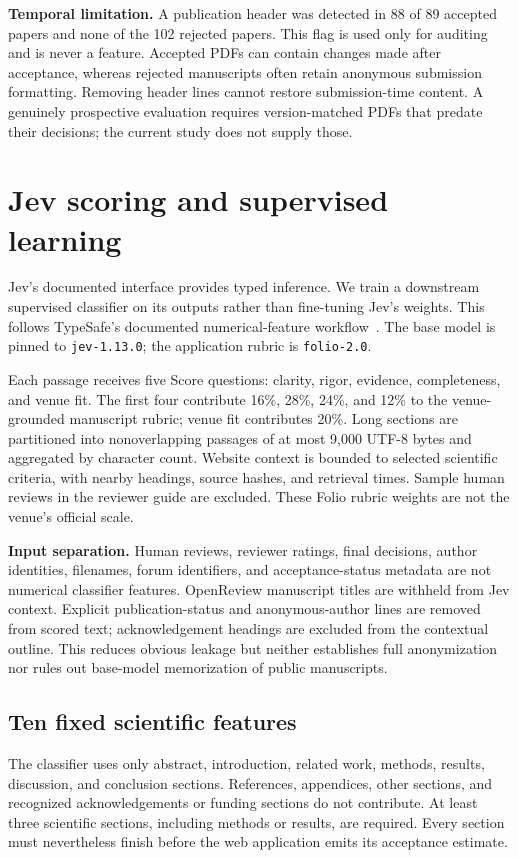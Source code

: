 \documentclass[11pt]{article}
\begin{document}
\textbf{Temporal limitation.} A publication header was detected in 88 of 89 accepted papers and none of the 102 rejected papers. This flag is used only for auditing and is never a feature. Accepted PDFs can contain changes made after acceptance, whereas rejected manuscripts often retain anonymous submission formatting. Removing header lines cannot restore submission-time content. A genuinely prospective evaluation requires version-matched PDFs that predate their decisions; the current study does not supply those.

\section{Jev scoring and supervised learning}
Jev's documented interface provides typed inference. We train a downstream supervised classifier on its outputs rather than fine-tuning Jev's weights. This follows TypeSafe's documented numerical-feature workflow~\cite{jev,features}. The base model is pinned to \texttt{jev-1.13.0}; the application rubric is \texttt{folio-2.0}.

Each passage receives five Score questions: clarity, rigor, evidence, completeness, and venue fit. The first four contribute 16\%, 28\%, 24\%, and 12\% to the venue-grounded manuscript rubric; venue fit contributes 20\%. Long sections are partitioned into nonoverlapping passages of at most 9,000 UTF-8 bytes and aggregated by character count. Website context is bounded to selected scientific criteria, with nearby headings, source hashes, and retrieval times. Sample human reviews in the reviewer guide are excluded. These Folio rubric weights are not the venue's official scale.

\textbf{Input separation.} Human reviews, reviewer ratings, final decisions, author identities, filenames, forum identifiers, and acceptance-status metadata are not numerical classifier features. OpenReview manuscript titles are withheld from Jev context. Explicit publication-status and anonymous-author lines are removed from scored text; acknowledgement headings are excluded from the contextual outline. This reduces obvious leakage but neither establishes full anonymization nor rules out base-model memorization of public manuscripts.

\subsection{Ten fixed scientific features}
The classifier uses only abstract, introduction, related work, methods, results, discussion, and conclusion sections. References, appendices, other sections, and recognized acknowledgements or funding sections do not contribute. At least three scientific sections, including methods or results, are required. Every section must nevertheless finish before the web application emits its acceptance estimate.
\end{document}
